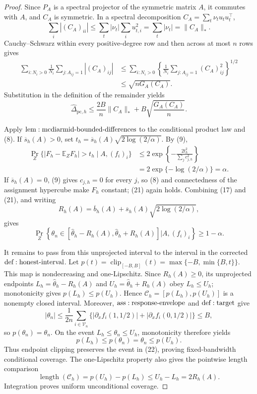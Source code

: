 \documentclass{article}
\begin{document}
\begin{proof}
Since \(P_A\) is a spectral projector of the symmetric matrix \(A\), it commutes with \(A\), and \(C_A\) is symmetric.  In a spectral decomposition \(C_A=\sum_t\nu_tu_tu_t^\top\),
\[
 \sum_i|(C_A)_{ii}|
 \leq\sum_t|\nu_t|\sum_i u_{t,i}^2
 =\sum_t|\nu_t|=\|C_A\|_*.
\tag{18}
\]
Cauchy--Schwarz within every positive-degree row and then across at most \(n\) rows gives
\[
\begin{aligned}
 \sum_{i:N_i>0}\frac1{N_i}\sum_{j:A_{ij}=1}|(C_A)_{ij}|
 &\leq\sum_{i:N_i>0}
 \left\{\frac1{N_i}\sum_{j:A_{ij}=1}(C_A)_{ij}^2\right\}^{1/2}\\
 &\leq\sqrt{nG_A(C_A)}.
\end{aligned}
\tag{19}
\]
Substitution in the definition of the remainder yields
\[
 \widehat\Delta_{\mathrm{pc},h}
 \leq\frac{2B}{n}\|C_A\|_*+B\sqrt{\frac{G_A(C_A)}n}.
\tag{20}
\]

Apply \({\rm lem:mcdiarmid\text{-}bounded\text{-}differences}\) to the conditional product law and (8).  If \(\overline s_h(A)>0\), set \(t_h=\overline s_h(A)\sqrt{2\log(2/\alpha)}\).  By (9),
\[
\begin{aligned}
 \Pr_Z\{|F_h-\mathbb E_ZF_h|>t_h\mid A,(f_i)_i\}
 &\leq2\exp\left\{-\frac{2t_h^2}{\sum_jc_{j,h}^2}\right\}\\
 &=2\exp\{-\log(2/\alpha)\}=\alpha.
\end{aligned}
\tag{21}
\]
If \(\overline s_h(A)=0\), (9) gives \(c_{j,h}=0\) for every \(j\), so (8) and connectedness of the assignment hypercube make \(F_h\) constant; (21) again holds.  Combining (17) and (21), and writing
\[
 R_h(A)=\overline b_h(A)+\overline s_h(A)\sqrt{2\log(2/\alpha)},
\]
gives
\[
 \Pr_Z\!\left\{\theta_n\in
 [\widehat\theta_h-R_h(A),\widehat\theta_h+R_h(A)]
 \mathrel{\Big|}A,(f_i)_i\right\}\geq1-\alpha.
\tag{22}
\]

It remains to pass from this unprojected interval to the interval in the corrected \({\rm def:honest\text{-}interval}\).  Let \(p(t)=\operatorname{clip}_{[-B,B]}(t)=\max\{-B,\min\{B,t\}\}\).  This map is nondecreasing and one-Lipschitz.  Since \(R_h(A)\geq0\), its unprojected endpoints \(L_h=\widehat\theta_h-R_h(A)\) and \(U_h=\widehat\theta_h+R_h(A)\) obey \(L_h\leq U_h\); monotonicity gives \(p(L_h)\leq p(U_h)\).  Hence \(\mathcal C_h=[p(L_h),p(U_h)]\) is a nonempty closed interval.  Moreover, \({\rm ass:response\text{-}envelope}\) and \({\rm def:target}\) give
\[
 |\theta_n|
 \leq\frac1{2n}\sum_{i\in\mathcal V_n}
 \{|\partial_xf_i(1,1/2)|+|\partial_xf_i(0,1/2)|\}
 \leq B,
\tag{23}
\]
so \(p(\theta_n)=\theta_n\).  On the event \(L_h\leq\theta_n\leq U_h\), monotonicity therefore yields
\[
 p(L_h)\leq p(\theta_n)=\theta_n\leq p(U_h).
\tag{24}
\]
Thus endpoint clipping preserves the event in (22), proving fixed-bandwidth conditional coverage.  The one-Lipschitz property also gives the pointwise length comparison
\[
 \operatorname{length}(\mathcal C_h)
 =p(U_h)-p(L_h)\leq U_h-L_h=2R_h(A).
\tag{25}
\]
Integration proves uniform unconditional coverage.


\end{proof}
\end{document}
